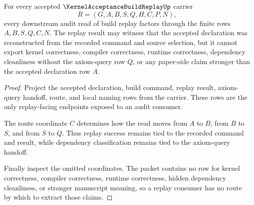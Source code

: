 \begin{theorem}
\label{thm:kernel-acceptance-build-replay-nonescape}
For every accepted $\KernelAcceptanceBuildReplayUp$ carrier
$$
R=(G,A,B,S,Q,H,C,P,N),
$$
every downstream audit read of build replay factors through the finite rows $A,B,S,Q,C,N$. The replay result may witness that the accepted declaration was reconstructed from the recorded command and source selection, but it cannot export kernel correctness, compiler correctness, runtime correctness, dependency cleanliness without the axiom-query row $Q$, or any paper-side claim stronger than the accepted declaration row $A$.
\end{theorem}
\begin{proof}
Project the accepted declaration, build command, replay result, axiom-query handoff, route, and local naming rows from the carrier. These rows are the only replay-facing endpoints exposed to an audit consumer.

The route coordinate $C$ determines how the read moves from $A$ to $B$, from $B$ to $S$, and from $S$ to $Q$. Thus replay success remains tied to the recorded command and result, while dependency classification remains tied to the axiom-query handoff.

Finally inspect the omitted coordinates. The packet contains no row for kernel correctness, compiler correctness, runtime correctness, hidden dependency cleanliness, or stronger manuscript meaning, so a replay consumer has no route by which to extract those claims.
\end{proof}


\begin{closurestatus}{\KernelAcceptanceBuildReplayUp}
  \theoryclosure{\seedClosure}
  \formalstatus{\unformalizedV}
\end{closurestatus}
